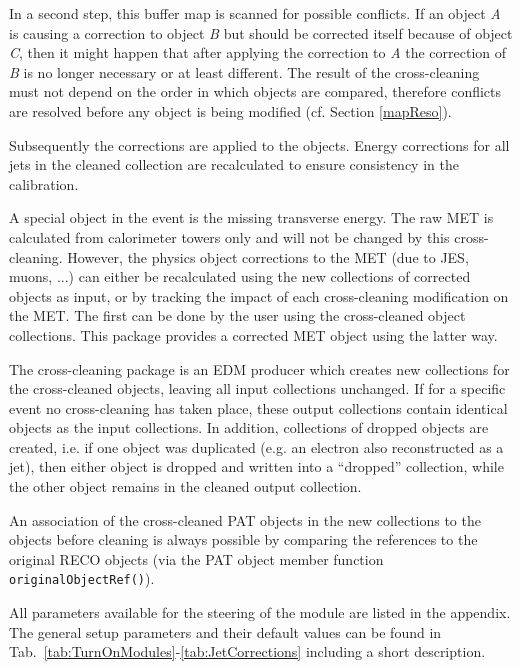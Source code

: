 \documentclass{cmspaper}
\begin{document}
In a second step, this buffer map is scanned for possible conflicts.
If an object {\it A} is causing a correction to object {\it B} but should
be corrected itself because of object {\it C}, then it might happen that after
applying the correction to {\it A} the correction of {\it B} is no longer
necessary or at least different.
The result of the cross-cleaning must not depend on the order in which objects
are compared, therefore conflicts are resolved before any object is being
modified (cf. Section \ref{mapReso}).

Subsequently the corrections are applied to the objects. Energy corrections for
all jets in the cleaned collection are recalculated to ensure consistency
in the calibration.

A special object in the event is the missing transverse energy. The raw
MET is calculated from calorimeter towers only and will not be changed by this
cross-cleaning. However, the physics object corrections to the MET (due to JES,
muons, ...) can either be
recalculated using the new collections of corrected objects as input, or by
tracking the impact of each cross-cleaning modification on the MET. The first
can be done by the user using the cross-cleaned object collections. This
package provides a corrected MET object using the latter way.

The cross-cleaning package is an EDM producer which creates new collections for
the cross-cleaned objects, leaving all input collections unchanged. If for a
specific event no cross-cleaning has taken place, these output collections
contain identical objects as the input collections.  In addition, collections
of dropped objects are created, i.e. if one object was duplicated (e.g. an
electron also reconstructed as a jet), then either object is dropped and
written into a ``dropped'' collection, while the other object remains in the
cleaned output collection.

An association of the cross-cleaned PAT objects in the new collections to the
objects before cleaning is always possible by comparing the references to the
original RECO objects (via the PAT object member function
\\\texttt{originalObjectRef()}). 

All parameters available for the steering of the module are listed in the
appendix. The general setup parameters and their default values can be found in
Tab.~\ref{tab:TurnOnModules}-\ref{tab:JetCorrections} including a short
description.
\end{document}

